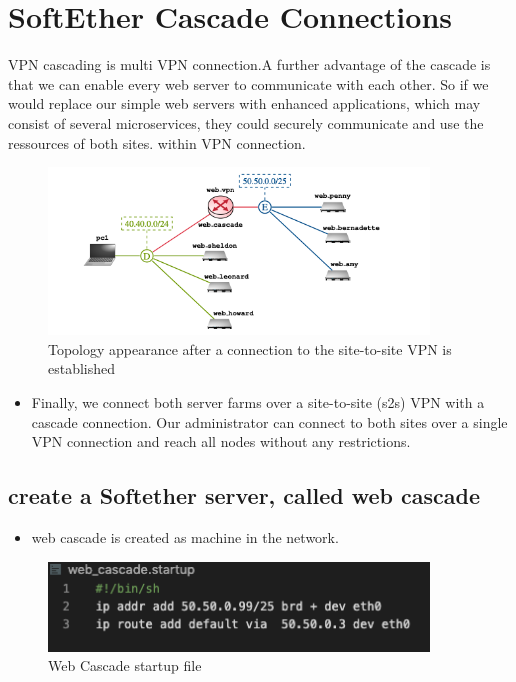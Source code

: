\section {SoftEther Cascade Connections}
VPN cascading is multi VPN connection.A further advantage of the cascade is that we can enable every web server
to communicate with each other. So if we would replace our simple web servers with
enhanced applications, which may consist of several microservices, they could securely
communicate and use the ressources of both sites. within VPN connection.
\begin{figure}[H]
\centering
  \includegraphics[width=0.9\textwidth]{Images/cascade_topology.png}
  \caption{Topology appearance after a connection to the site-to-site VPN is established}
  \label{fig }
\end{figure}

\begin{itemize}
    \item Finally, we connect both server farms over a site-to-site (s2s) VPN with a cascade connection. Our administrator can connect to both sites over a single VPN connection and reach all nodes  without any restrictions. 
\end{itemize}
\subsection{create a Softether server, called web cascade}
\begin{itemize}
    \item web cascade is created as machine in the network.
\end{itemize}
\begin{figure}[H]
\centering
  \includegraphics[width=0.9\textwidth]{Images/web_cascade.startup.png}
  \caption{Web Cascade startup file}
  \label{fig }
\end{figure}
